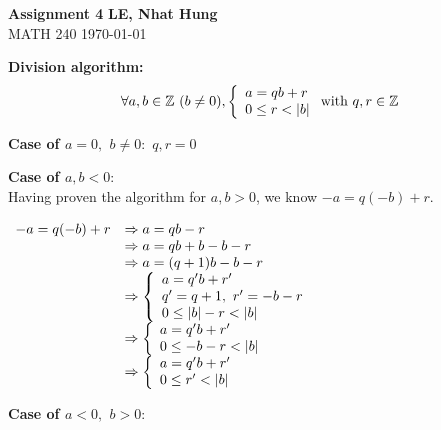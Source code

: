 \documentclass[a4paper, 11pt]{article}
\begin{document}
\noindent
\large\textbf{Assignment 4} \hfill \textbf{LE, Nhat Hung} \\
\normalsize MATH 240 \hfill \today

\begin{myEnumerate}
	\item
	
    \textbf{Division algorithm:}
    $$
    \forall a, b \in \mathbb{Z} \textnormal{ } (b \neq 0),
    \left\{
    	\begin{array}{ll}
        	a = qb + r \\
        	0 \leq r < |b|
    	\end{array}
	\right. \textnormal{with } q,r \in \mathbb{Z}
    $$
    
    \textbf{Case of $a = 0,$ $b \neq 0:$} $q,r = 0$
    
    \textbf{Case of $a, b < 0:$} \\
    Having proven the algorithm for $a, b > 0$, we know $-a = q(-b) + r$.
    
    \(
    \begin{array}{ll}
    	-a = q(-b) + r & \Rightarrow a = qb - r \\
        			   & \Rightarrow a = qb + b - b - r \\
                       & \Rightarrow a = (q + 1)b - b - r \\
                       & \Rightarrow
        \left\{
    		\begin{array}{ll}
        		a = q'b + r' \\
        		q' = q + 1, \textnormal{ } r' = -b - r \\
                0 \leq |b| - r < |b|
    		\end{array}
		\right. \\
        			  & \Rightarrow
        \left\{
    		\begin{array}{ll}
        		a = q'b + r' \\
        		0 \leq -b - r < |b|
    		\end{array}
		\right. \\
        			  & \Rightarrow
        \left\{
    		\begin{array}{ll}
        		a = q'b + r' \\
        		0 \leq r' < |b|
    		\end{array}
		\right.
    \end{array} \\ \)
    
    \textbf{Case of $a < 0,$ $b > 0:$}
    

\end{myEnumerate}
\end{document}

